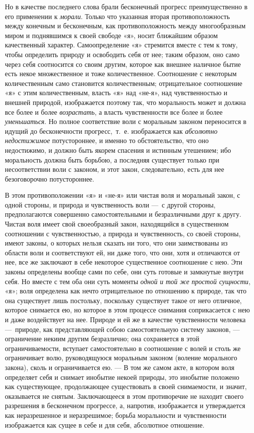 {Но в качестве последнего слова брали бесконечный прогресс преимущественно в
его применении к {\em морали}. Только что указанная
вторая противоположность между конечным и бесконечным, как
противоположность между многообразным миром и поднявшимся к своей свободе
«я», носит ближайшим образом качественный характер. Самоопределение «я»
стремится вместе с тем к тому, чтобы определить природу и освободить себя
от нее; таким образом, оно само через себя соотносится со своим другим,
которое как внешнее наличное бытие есть некое множественное и тоже
количественное. Соотношение с некоторым количественным само становится
количественным; отрицательное соотношение «я» с этим количественным, власть
«я» над «не-я», над чувственностью и внешней природой, изображается поэтому
так, что моральность может и должна все более и более
{\em возрастать}, а власть чувственности все более и
более {\em уменьшаться}. Но полное соответствие воли с
моральным законом переносится в идущий до бесконечности прогресс,~т.~е.
изображается как {\em абсолютно недостижимое}
потустороннее, и именно то обстоятельство, что оно недостижимо, и должно
быть якорем спасения и истинным утешением; ибо моральность должна быть
борьбою, а последняя существует только при несоответствии воли с законом, и
этот закон, следовательно, есть для нее безоговорочно потустороннее.

В этом противоположении «я» и «не-я» или чистая воля и моральный закон, с
одной стороны, и природа и чувственность воли —~с другой стороны,
предполагаются совершенно самостоятельными и безразличными друг к другу.
Чистая воля имеет свой своеобразный закон, находящийся в существенном
соотношении с чувственностью, а природа и чувственность, со своей стороны,
имеют законы, о которых нельзя сказать ни того, что они заимствованы из
области воли и соответствуют ей, ни даже того, что они, хотя и отличаются
от нее, все же заключают в себе некоторое существенное соотношение с нею.
Эти законы определены вообще сами по себе, они суть готовые и замкнутые
внутри себя. Но вместе с тем оба они суть моменты
{\em одной и той же простой сущности}, «я»; воля
определена как нечто отрицательное по отношению к природе, так что она
существует лишь постольку, поскольку существует такое от него отличное,
которое снимается ею, но которое в этом процессе снимания соприкасается с
нею и даже воздействует на нее. Природе и ей же в качестве чувственности
человека —~природе, как представляющей собою самостоятельную систему
законов, — ограничение некиим другим безразлично; она сохраняется в этой
ограничиваемости, вступает самостоятельно в соотношение с волей и столь же
ограничивает волю, руководящуюся моральным законом (воление морального
закона), сколь и ограничивается ею. — В том же самом акте, в котором воля
определяет себя и снимает инобытие некоей природы, это инобытие положено
как существующее, продолжающее существовать в своей снимаемости, и значит,
оказывается не снятым. Заключающееся в этом противоречие не находит своего
разрешения в бесконечном прогрессе, а, напротив, изображается и
утверждается как неразрешенное и неразрешимое; борьба моральности и
чувственности изображается как сущее в себе и для себя, абсолютное
отношение.

}
